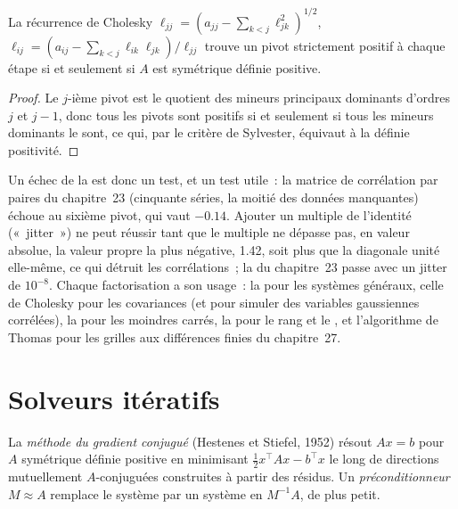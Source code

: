 \begin{proposition}\label{prop:qm:floating-point-and-numerical-linear-algebra:chol}
La récurrence de Cholesky $\ell_{jj} = (a_{jj} - \sum_{k<j}\ell_{jk}^2)^{1/2}$, $\ell_{ij} = (a_{ij} - \sum_{k<j}\ell_{ik}\ell_{jk})/\ell_{jj}$ trouve un pivot strictement positif à chaque étape si et seulement si $A$ est
symétrique définie positive.
\end{proposition}

\begin{proof}
Le $j$-ième pivot est le quotient des mineurs principaux dominants d'ordres $j$ et $j - 1$, donc tous les pivots sont positifs si et seulement si tous les mineurs dominants le sont, ce qui, par le critère de
Sylvester, équivaut à la définie positivité.
\end{proof}

Un échec de la  est donc un test, et un test utile~: la matrice de corrélation par paires du chapitre~23 (cinquante séries, la moitié des données manquantes) échoue au sixième pivot, qui vaut $-0.14$. Ajouter un
multiple de l'identité («~jitter~») ne peut réussir tant que le multiple ne dépasse pas, en valeur absolue, la valeur propre la plus négative, 1.42, soit plus que la diagonale unité elle-même, ce qui détruit les corrélations~; la  du chapitre~23 passe avec un jitter de
$10^{-8}$. Chaque factorisation a son usage~: la  pour les systèmes généraux, celle de Cholesky pour les covariances (et pour simuler des variables gaussiennes corrélées), la  pour les moindres carrés, la  pour le rang et le , et
l'algorithme de Thomas pour les grilles aux différences finies du chapitre~27.

\section{Solveurs itératifs}

\begin{definition}\label{def:qm:floating-point-and-numerical-linear-algebra:cg}
La \emph{méthode du gradient conjugué} (Hestenes et Stiefel, 1952) résout $Ax = b$ pour $A$ symétrique définie positive en minimisant $\frac12x^\top Ax - b^\top x$ le long
de directions mutuellement $A$-conjuguées construites à partir des résidus. Un \emph{préconditionneur} $M \approx A$ remplace le système par un système en $M^{-1}A$, de  plus petit.
\end{definition}

